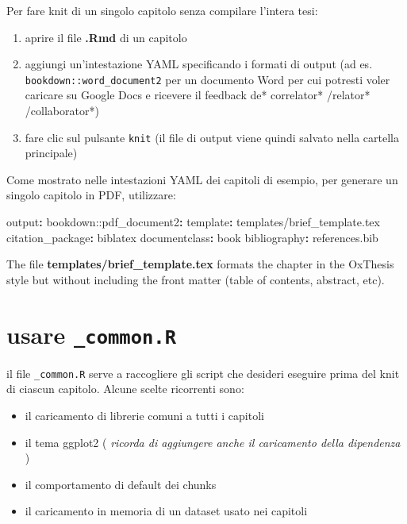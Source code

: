 \documentclass[a4paper, 11pt, nobind]{templates/ociamthesis}
\providecommand{\tightlist}{%
  \setlength{\itemsep}{0pt}\setlength{\parskip}{0pt}}
\newenvironment{Shaded}{\begin{snugshade}}{\end{snugshade}}
\newcommand{\AttributeTok}[1]{\textcolor[rgb]{0.77,0.63,0.00}{#1}}
\newcommand{\FunctionTok}[1]{\textcolor[rgb]{0.00,0.00,0.00}{#1}}
\newcommand{\KeywordTok}[1]{\textcolor[rgb]{0.13,0.29,0.53}{\textbf{#1}}}
\renewenvironment{Shaded}
{
  \vspace{10pt}%
  \begin{snugshade}%
}{%
  \end{snugshade}%
  \vspace{8pt}%
}
\begin{document}
Per fare knit di un singolo capitolo senza compilare l'intera tesi:

\begin{enumerate}
\def\labelenumi{\arabic{enumi}.}
\tightlist
\item
  aprire il file \textbf{.Rmd} di un capitolo
\item
  aggiungi un'intestazione YAML specificando i formati di output (ad es. \texttt{bookdown::word\_document2} per un documento Word per cui potresti voler caricare su Google Docs e ricevere il feedback de* correlator* /relator* /collaborator*)
\item
  fare clic sul pulsante \texttt{knit} (il file di output viene quindi salvato nella cartella principale)
\end{enumerate}

Come mostrato nelle intestazioni YAML dei capitoli di esempio, per generare un singolo capitolo in PDF, utilizzare:

\begin{Shaded}
\begin{Highlighting}[]
\FunctionTok{output}\KeywordTok{:}
\AttributeTok{  bookdown:}\FunctionTok{:pdf\_document2}\KeywordTok{:}
\AttributeTok{    }\FunctionTok{template}\KeywordTok{:}\AttributeTok{ templates/brief\_template.tex}
\AttributeTok{    }\FunctionTok{citation\_package}\KeywordTok{:}\AttributeTok{ biblatex}
\FunctionTok{documentclass}\KeywordTok{:}\AttributeTok{ book}
\FunctionTok{bibliography}\KeywordTok{:}\AttributeTok{ references.bib}
\end{Highlighting}
\end{Shaded}

The file \textbf{templates/brief\_template.tex} formats the chapter in the OxThesis style but without including the front matter (table of contents, abstract, etc).

\hypertarget{usare-_common.r}{%
\section{\texorpdfstring{usare \texttt{\_common.R}}{usare \_common.R}}\label{usare-_common.r}}

il file \texttt{\_common.R} serve a raccogliere gli script che desideri eseguire prima del knit di ciascun capitolo. Alcune scelte ricorrenti sono:

\begin{itemize}
\tightlist
\item
  il caricamento di librerie comuni a tutti i capitoli
\item
  il tema ggplot2 ( \emph{ricorda di aggiungere anche il caricamento della dipendenza} )
\item
  il comportamento di default dei chunks
\item
  il caricamento in memoria di un dataset usato nei capitoli
\end{itemize}
\end{document}
